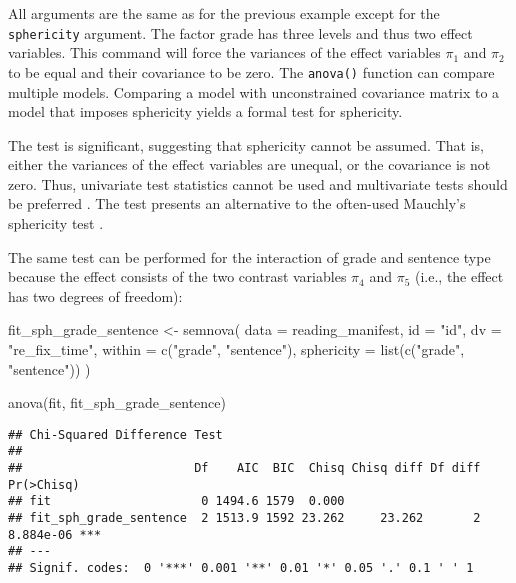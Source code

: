 \documentclass[
]{book}
\newenvironment{Shaded}{\begin{snugshade}}{\end{snugshade}}
\newcommand{\AttributeTok}[1]{\textcolor[rgb]{0.77,0.63,0.00}{#1}}
\newcommand{\FunctionTok}[1]{\textcolor[rgb]{0.00,0.00,0.00}{#1}}
\newcommand{\NormalTok}[1]{#1}
\newcommand{\OtherTok}[1]{\textcolor[rgb]{0.56,0.35,0.01}{#1}}
\newcommand{\StringTok}[1]{\textcolor[rgb]{0.31,0.60,0.02}{#1}}
\begin{document}
All arguments are the same as for the previous example except for the \texttt{sphericity} argument. The factor grade has three levels and thus two effect variables. This command will force the variances of the effect variables \(\pi_1\) and \(\pi_2\) to be equal and their covariance to be zero. The \texttt{anova()} function can compare multiple models. Comparing a model with unconstrained covariance matrix to a model that imposes sphericity yields a formal test for sphericity.

The test is significant, suggesting that sphericity cannot be assumed. That is, either the variances of the effect variables are unequal, or the covariance is not zero. Thus, univariate test statistics cannot be used and multivariate tests should be preferred \citep[e.g.,][]{Lane2016a}. The test presents an alternative to the often-used Mauchly's sphericity test \citep{Mauchly1940a}.

The same test can be performed for the interaction of grade and sentence type because the effect consists of the two contrast variables \(\pi_4\) and \(\pi_5\) (i.e., the effect has two degrees of freedom):

\begin{Shaded}
\begin{Highlighting}[]
\NormalTok{fit\_sph\_grade\_sentence }\OtherTok{\textless{}{-}} \FunctionTok{semnova}\NormalTok{(}
    \AttributeTok{data =}\NormalTok{ reading\_manifest,}
    \AttributeTok{id =} \StringTok{"id"}\NormalTok{, }
    \AttributeTok{dv =} \StringTok{"re\_fix\_time"}\NormalTok{,}
    \AttributeTok{within =} \FunctionTok{c}\NormalTok{(}\StringTok{"grade"}\NormalTok{, }\StringTok{"sentence"}\NormalTok{),}
    \AttributeTok{sphericity =} \FunctionTok{list}\NormalTok{(}\FunctionTok{c}\NormalTok{(}\StringTok{"grade"}\NormalTok{, }\StringTok{"sentence"}\NormalTok{))}
\NormalTok{)}

\FunctionTok{anova}\NormalTok{(fit, fit\_sph\_grade\_sentence)}
\end{Highlighting}
\end{Shaded}

\begin{verbatim}
## Chi-Squared Difference Test
## 
##                        Df    AIC  BIC  Chisq Chisq diff Df diff Pr(>Chisq)    
## fit                     0 1494.6 1579  0.000                                  
## fit_sph_grade_sentence  2 1513.9 1592 23.262     23.262       2  8.884e-06 ***
## ---
## Signif. codes:  0 '***' 0.001 '**' 0.01 '*' 0.05 '.' 0.1 ' ' 1
\end{verbatim}
\end{document}
